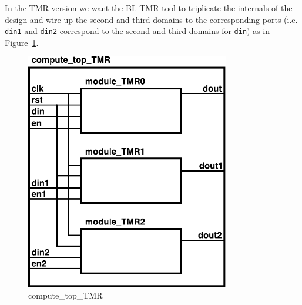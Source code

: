 In the TMR version we want the BL-TMR tool to triplicate the internals of the
design and wire up the second and third domains to the corresponding ports (i.e.
\texttt{din1} and \texttt{din2} correspond to the second and third domains for
\texttt{din}) as in Figure~\ref{fig:compute_top_tmr}.

\begin{figure}[htb]
\begin{center}
\includegraphics[width=3.5in]{compute_top_tmr.pdf}
\caption{compute\_top\_TMR}
\label{fig:compute_top_tmr}
\end{center}
\end{figure}

